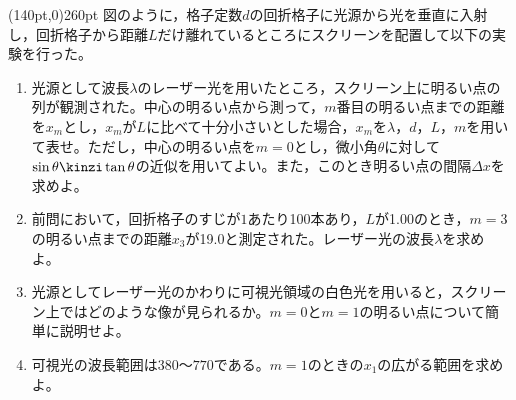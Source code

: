 \hakosyokika
\item
    \begin{mawarikomi}[10](140pt,0){260pt}{}
    図のように，格子定数$d$の回折格子に光源から光を垂直に入射し，回折格子から距離$L$だけ離れているところにスクリーンを配置して以下の実験を行った。
        \begin{enumerate}
            \item 光源として波長$\lambda $のレーザー光を用いたところ，スクリーン上に明るい点の列が観測された。中心の明るい点から測って，$m$番目の明るい点までの距離を$x_m$とし，$x_m$が$L$に比べて十分小さいとした場合，$x_m$を$\lambda $，$d$，$L$，$m$を用いて表せ。ただし，中心の明るい点を$m=0$とし，微小角$\theta $に対して$\sin{\theta }\kinzi \tan{\theta }$の近似を用いてよい。また，このとき明るい点の間隔$\varDelta x$を求めよ。
            \item 前問において，回折格子のすじが$1$あたり100本あり，$L$が1.00のとき，$m=3$の明るい点までの距離$x_3$が19.0と測定された。レーザー光の波長$\lambda $を求めよ。
            \item 光源としてレーザー光のかわりに可視光領域の白色光を用いると，スクリーン上ではどのような像が見られるか。$m=0$と$m=1$の明るい点について簡単に説明せよ。
            \item 可視光の波長範囲は$380$～$770$である。$m=1$のときの$x_1$の広がる範囲を求めよ。
        \end{enumerate}
    \end{mawarikomi}